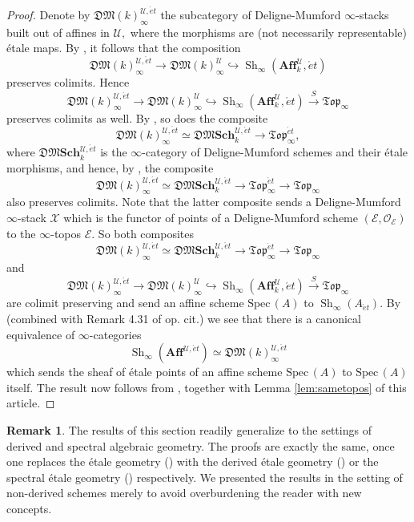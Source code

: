 \documentclass[12pt]{amsart}
\theoremstyle{definition}
\newtheorem{remark}[dummy]{Remark}
\newcommand{\cE}{\mathcal{E}}
\newcommand{\cU}{\mathcal{U}}
\newcommand{\cX}{\mathcal{X}}
\newcommand{\Affku}{\mathbf{Aff}^{\cU}_{k}}
\newcommand{\Topi}{\mathfrak{Top}_\i}
\newcommand{\Spec}{\mathrm{Spec}\,}
\newcommand{\Sh}{\operatorname{Sh}}
\newcommand{\et}{\acute{e}t}
\def\Sch{\mathbf{Sch}}
\renewcommand{\i}{\infty}
\def\Shi{\Sh_\i}
\def\Dmschet{\mathfrak{DM}\Sch^{\cU,\et}_k}
\begin{document}
\begin{proof}
Denote by $\mathfrak{DM}\left(k\right)_\i^{\cU,\et}$ the subcategory of Deligne-Mumford $\i$-stacks built out of affines in $\cU,$ where the morphisms are (not necessarily representable) \'etale maps. By \cite[Proposition 5.2.11 and Remark 5.3.11]{higherdave}, it follows that the composition
$$\mathfrak{DM}\left(k\right)_\i^{\cU,\et} \to \mathfrak{DM}\left(k\right)_\i^{\cU} \hookrightarrow \Shi\left(\Affku,\et\right)$$ preserves colimits. 
Hence $$\mathfrak{DM}\left(k\right)_\i^{\cU,\et} \to \mathfrak{DM}\left(k\right)_\i^{\cU} \hookrightarrow \Shi\left(\Affku,\et\right) \stackrel{S}{\longrightarrow} \Topi$$ preserves colimits as well. By \cite[Remark 5.3.11, Lemma 5.1.1, and Proposition 4.3.1]{dagv}, so does the composite $$\mathfrak{DM}\left(k\right)_\i^{\cU,\et} \simeq \Dmschet \to \Topi^{\et},$$ where $\Dmschet$ is the $\i$-category of Deligne-Mumford schemes and their \'etale morphisms, and hence, by \cite[Theorem 6.3.5.13]{htt}, the composite $$\mathfrak{DM}\left(k\right)_\i^{\cU,\et} \simeq \Dmschet \to \Topi^{\et} \to \Topi$$ also preserves colimits. Note that the latter composite sends a Deligne-Mumford $\i$-stack $\cX$ which is the functor of points of a Deligne-Mumford scheme $\left(\cE,\mathcal{O}_\cE\right)$ to the $\i$-topos $\cE.$ So both composites $$\mathfrak{DM}\left(k\right)_\i^{\cU,\et} \simeq \Dmschet \to \Topi^{\et} \to \Topi$$ and $$\mathfrak{DM}\left(k\right)_\i^{\cU,\et} \to \mathfrak{DM}\left(k\right)_\i^{\cU} \hookrightarrow \Shi\left(\Affku,\et\right) \stackrel{S}{\longrightarrow} \Topi$$ are colimit preserving and send an affine scheme $\Spec\left(A\right)$ to $\Shi\left(A_{\et}\right).$ By \cite[Theorem 5.37]{higherdave} (combined with Remark 4.31 of op. cit.) we see that there is a canonical equivalence of $\i$-categories $$\Shi\left(\mathbf{Aff}^{\cU,\et}\right) \simeq \mathfrak{DM}\left(k\right)_\i^{\cU,\et}$$ which sends the sheaf of \'etale points of an affine scheme $\Spec\left(A\right)$ to $\Spec\left(A\right)$ itself. The result now follows from \cite[Proposition 5.5.4.20 and Theorem 5.1.5.6]{htt}, together with Lemma \ref{lem:sametopos} of this article.
\end{proof}

\begin{remark}
The results of this section readily generalize to the settings of derived and spectral algebraic geometry. The proofs are exactly the same, once one replaces the \'etale geometry (\cite[Definition 2.6.12]{dagv}) with the derived \'etale geometry (\cite[Definition 4.3.13]{dagv}) or the spectral \'etale geometry  (\cite[Definition 8.11]{dagvii}) respectively. We presented the results in the setting of non-derived schemes merely to avoid overburdening the reader with new concepts.
\end{remark}
\end{document}
